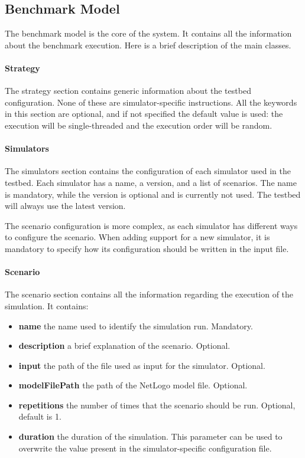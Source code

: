 \documentclass[12pt,a4paper,openright,twoside]{book}
\begin{document}
\subsection*{Benchmark Model}

The benchmark model is the core of the system. It contains all the information about the benchmark execution.
Here is a brief description of the main classes.

\paragraph*{Strategy} The strategy section contains generic information about the testbed configuration. None of these 
are simulator-specific instructions.
All the keywords in this section are optional, and if not specified the default value is used: the execution will be
single-threaded and the execution order will be random.

\paragraph*{Simulators} The simulators section contains the configuration of each simulator used in the testbed.
Each simulator has a name, a version, and a list of scenarios. The name is mandatory, while the version is optional 
and is currently not used. The testbed will always use the latest version.

The scenario configuration is more complex, as each simulator has different ways to configure the scenario.
When adding support for a new simulator, it is mandatory to specify how its configuration should be written in the input file.

\paragraph*{Scenario}
The scenario section contains all the information regarding the execution of the simulation.
It contains:
\begin{itemize}
    \item \textbf{name} the name used to identify the simulation run. Mandatory.
    \item \textbf{description} a brief explanation of the scenario. Optional.
    \item \textbf{input} the path of the file used as input for the simulator. Optional.
    \item \textbf{modelFilePath} the path of the NetLogo model file. Optional.
    \item \textbf{repetitions} the number of times that the scenario should be run. Optional, default is 1.
    \item \textbf{duration} the duration of the simulation. This parameter can be used to overwrite the value present in the simulator-specific configuration file.
\end{itemize}
\end{document}
